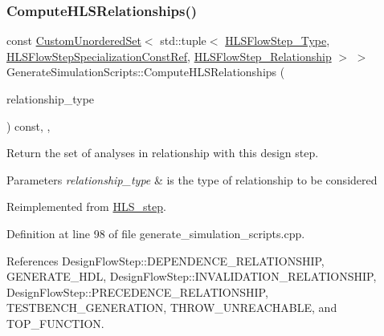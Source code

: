 \subsubsection{\texorpdfstring{Compute\+H\+L\+S\+Relationships()}{ComputeHLSRelationships()}}
{\footnotesize\ttfamily const \hyperlink{classCustomUnorderedSet}{Custom\+Unordered\+Set}$<$ std\+::tuple$<$ \hyperlink{hls__step_8hpp_ada16bc22905016180e26fc7e39537f8d}{H\+L\+S\+Flow\+Step\+\_\+\+Type}, \hyperlink{hls__step_8hpp_a5fdd2edf290c196531d21d68e13f0e74}{H\+L\+S\+Flow\+Step\+Specialization\+Const\+Ref}, \hyperlink{hls__step_8hpp_a3ad360b9b11e6bf0683d5562a0ceb169}{H\+L\+S\+Flow\+Step\+\_\+\+Relationship} $>$ $>$ Generate\+Simulation\+Scripts\+::\+Compute\+H\+L\+S\+Relationships (\begin{DoxyParamCaption}\item[{const \hyperlink{classDesignFlowStep_a723a3baf19ff2ceb77bc13e099d0b1b7}{Design\+Flow\+Step\+::\+Relationship\+Type}}]{relationship\+\_\+type }\end{DoxyParamCaption}) const\hspace{0.3cm}{\ttfamily [override]}, {\ttfamily [protected]}, {\ttfamily [virtual]}}



Return the set of analyses in relationship with this design step. 


\begin{DoxyParams}{Parameters}
{\em relationship\+\_\+type} & is the type of relationship to be considered \\
\hline
\end{DoxyParams}


Reimplemented from \hyperlink{classHLS__step_aed0ce8cca9a1ef18e705fc1032ad4de5}{H\+L\+S\+\_\+step}.



Definition at line 98 of file generate\+\_\+simulation\+\_\+scripts.\+cpp.



References Design\+Flow\+Step\+::\+D\+E\+P\+E\+N\+D\+E\+N\+C\+E\+\_\+\+R\+E\+L\+A\+T\+I\+O\+N\+S\+H\+IP, G\+E\+N\+E\+R\+A\+T\+E\+\_\+\+H\+DL, Design\+Flow\+Step\+::\+I\+N\+V\+A\+L\+I\+D\+A\+T\+I\+O\+N\+\_\+\+R\+E\+L\+A\+T\+I\+O\+N\+S\+H\+IP, Design\+Flow\+Step\+::\+P\+R\+E\+C\+E\+D\+E\+N\+C\+E\+\_\+\+R\+E\+L\+A\+T\+I\+O\+N\+S\+H\+IP, T\+E\+S\+T\+B\+E\+N\+C\+H\+\_\+\+G\+E\+N\+E\+R\+A\+T\+I\+ON, T\+H\+R\+O\+W\+\_\+\+U\+N\+R\+E\+A\+C\+H\+A\+B\+LE, and T\+O\+P\+\_\+\+F\+U\+N\+C\+T\+I\+ON.

\mbox{\label{classGenerateSimulationScripts_a58904865494c7a37559bb0490f5ee3a6}} 
